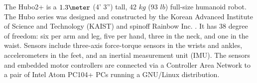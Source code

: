 The Hubo2+ is a $1.3\meter$ (4' 3'') tall, 42 $kg$ (93 $lb$) full-size
humanoid robot.  The Hubo series was designed and constructed by the
Korean Advanced Institute of Science and Technology (KAIST) and
spinoff Rainbow Inc. \cite{hubofirst}.  It has 38 degree of freedom:
six per arm and leg, five per hand, three in the neck, and one in the
waist.  Sensors include three-axis force-torque sensors in the wrists
and ankles, accelerometers in the feet, and an inertial measurement
unit (IMU).  The sensors and embedded motor controllers are connected
via a Controller Area Network to a pair of Intel Atom PC104+ PCs
running a GNU/Linux distribution.






